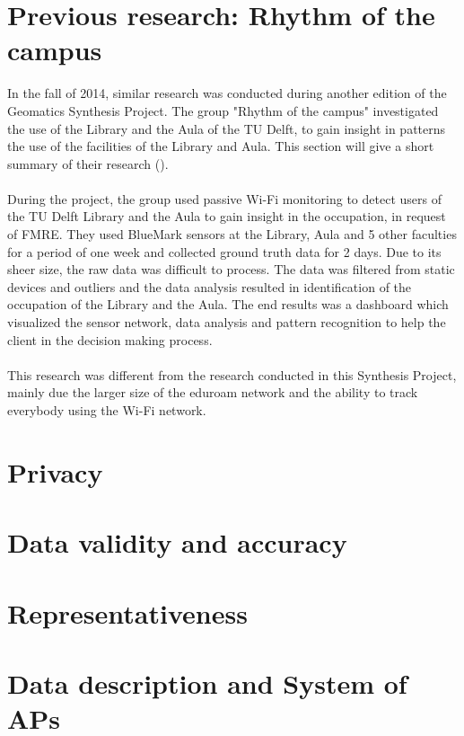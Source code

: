 \section{Previous research: Rhythm of the campus}
In the fall of 2014, similar research was conducted during another edition of the Geomatics Synthesis Project. The group "Rhythm of the campus" investigated the use of the Library and the Aula of the TU Delft, to gain insight in patterns the use of the facilities of the Library and Aula. This section will give a short summary of their research (\cite{rhythmofthecampus}).\\\\
During the project, the group used passive Wi-Fi monitoring to detect users of the TU Delft Library and the Aula to gain insight in the occupation, in request of FMRE. They used BlueMark sensors at the Library, Aula and 5 other faculties for a period of one week and collected ground truth data for 2 days. Due to its sheer size, the raw data was difficult to process. The data was filtered from static devices and outliers and the data analysis resulted in identification of the occupation of the Library and the Aula. The end results was a dashboard which visualized the sensor network, data analysis and pattern recognition to help the client in the decision making process.\\\\

This research was different from the research conducted in this Synthesis Project, mainly due the larger size of the eduroam network and the ability to track everybody using the Wi-Fi network.

\section{Privacy}

\section{Data validity and accuracy}

\section{Representativeness}

\section{Data description and System of APs}\label{datadescriptionandsystemofaps}
